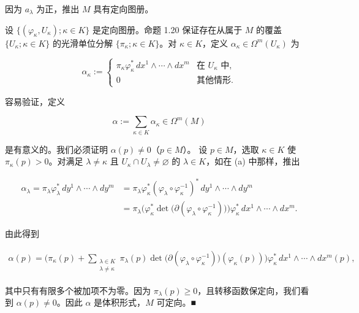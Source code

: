 \begin{proposition}
\begin{items}
因为 $ a_{\lambda} $ 为正，推出 $ M $ 具有定向图册。

\item

设 $ \{ (\varphi_{\kappa}, U_{\kappa}) ; \kappa \in K \} $ 是定向图册。命题 1.20 保证存在从属于 $ M $ 的覆盖 $ \{ U_{\kappa} ; \kappa \in K \} $ 的光滑单位分解 $ \{ \pi_{\kappa} ; \kappa \in K \} $。对 $ \kappa \in K $，定义 $ \alpha_{\kappa} \in \Omega^{m}(U_{\kappa}) $ 为

\begin{equation*}
\alpha_{\kappa} := \begin{cases} \pi_{\kappa}\varphi_{\kappa}^{*}\,dx^{1} \wedge \cdots \wedge dx^{m} & \text{在 } U_{\kappa} \text{ 中} , \\ 0 & \text{其他情形} . \end{cases}
\end{equation*}

容易验证，定义

\[
\alpha := \sum_{\kappa \in K} \alpha_{\kappa} \in \Omega^{m}(M)
\]

是有意义的。我们必须证明 $ \alpha(p) \neq 0 $（$ p \in M $）。
设 $ p \in M $，选取 $ \kappa \in K $ 使 $ \pi_{\kappa}(p) > 0 $。对满足 $ \lambda \neq \kappa $ 且 $ U_{\kappa} \cap U_{\lambda} \neq \varnothing $ 的 $ \lambda \in K $，如在 (a) 中那样，推出

\begin{equation*}
\begin{aligned}
\alpha_{\lambda} = \pi_{\lambda}\varphi_{\lambda}^{*}\,dy^{1} \wedge \cdots \wedge dy^{m} &= \pi_{\lambda}\varphi_{\kappa}^{*}(\varphi_{\lambda} \circ \varphi_{\kappa}^{-1})^{*}\,dy^{1} \wedge \cdots \wedge dy^{m} \\ &= \pi_{\lambda}\big(\varphi_{\kappa}^{*}\det\big(\partial(\varphi_{\lambda} \circ \varphi_{\kappa}^{-1})\big)\big)\varphi_{\kappa}^{*}\,dx^{1} \wedge \cdots \wedge dx^{m} .
\end{aligned}
\end{equation*}

由此得到

\begin{equation*}
\begin{aligned}
\alpha(p) = \Big( \pi_{\kappa}(p) + \sum_{\substack{\lambda \in K \\ \lambda \neq \kappa}} \pi_{\lambda}(p)\det\big(\partial(\varphi_{\lambda} \circ \varphi_{\kappa}^{-1})\big)(\varphi_{\kappa}(p)) \Big)\varphi_{\kappa}^{*}\,dx^{1} \wedge \cdots \wedge dx^{m}(p) ,
\end{aligned}
\end{equation*}

其中只有有限多个被加项不为零。因为 $ \pi_{\lambda}(p) \ge 0 $，且转移函数保定向，我们看到 $ \alpha(p) \neq 0 $。因此 $ \alpha $ 是体积形式，$ M $ 可定向。\nobreak\hspace{0.35em}■

\end{items}

\end{proposition}

